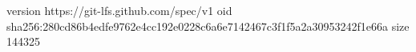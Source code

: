 version https://git-lfs.github.com/spec/v1
oid sha256:280cd86b4edfe9762e4cc192e0228c6a6e7142467c3f1f5a2a30953242f1e66a
size 144325
